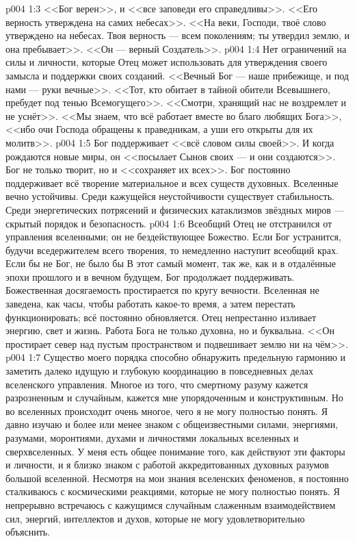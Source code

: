 \vs p004 1:3 <<Бог верен>>, и <<все заповеди его справедливы>>. <<Его верность утверждена на самих небесах>>. <<На веки, Господи, твоё слово утверждено на небесах. Твоя верность --- всем поколениям; ты утвердил землю, и она пребывает>>. <<Он --- верный Создатель>>.
\vs p004 1:4 Нет ограничений на силы и личности, которые Отец может использовать для утверждения своего замысла и поддержки своих созданий. <<Вечный Бог --- наше прибежище, и под нами --- руки вечные>>. <<Тот, кто обитает в тайной обители Всевышнего, пребудет под тенью Всемогущего>>. <<Смотри, хранящий нас не воздремлет и не уснёт>>. <<Мы знаем, что всё работает вместе во благо любящих Бога>>, <<ибо очи Господа обращены к праведникам, а уши его открыты для их молитв>>.
\vs p004 1:5 Бог поддерживает <<всё словом силы своей>>. И когда рождаются новые миры, он <<посылает Сынов своих --- и они создаются>>. Бог не только творит, но и <<сохраняет их всех>>. Бог постоянно поддерживает всё творение материальное и всех существ духовных. Вселенные вечно устойчивы. Среди кажущейся неустойчивости существует стабильность. Среди энергетических потрясений и физических катаклизмов звёздных миров --- скрытый порядок и безопасность.
\vs p004 1:6 Всеобщий Отец не отстранился от управления вселенными; он не бездействующее Божество. Если Бог устранится, будучи вседержителем всего творения, то немедленно наступит всеобщий крах. Если бы не Бог, не было бы  В этот самый момент, так же, как и в отдалённые эпохи прошлого и в вечном будущем, Бог продолжает поддерживать. Божественная досягаемость простирается по кругу вечности. Вселенная не заведена, как часы, чтобы работать какое\hyp{}то время, а затем перестать функционировать; всё постоянно обновляется. Отец непрестанно изливает энергию, свет и жизнь. Работа Бога не только духовна, но и буквальна. <<Он простирает север над пустым пространством и подвешивает землю ни на чём>>.
\vs p004 1:7 \pc Существо моего порядка способно обнаружить предельную гармонию и заметить далеко идущую и глубокую координацию в повседневных делах вселенского управления. Многое из того, что смертному разуму кажется разрозненным и случайным, кажется мне упорядоченным и конструктивным. Но во вселенных происходит очень многое, чего я не могу полностью понять. Я давно изучаю и более или менее знаком с общеизвестными силами, энергиями, разумами, моронтиями, духами и личностями локальных вселенных и сверхвселенных. У меня есть общее понимание того, как действуют эти факторы и личности, и я близко знаком с работой аккредитованных духовных разумов большой вселенной. Несмотря на мои знания вселенских феноменов, я постоянно сталкиваюсь с космическими реакциями, которые не могу полностью понять. Я непрерывно встречаюсь с кажущимся случайным слаженным взаимодействием сил, энергий, интеллектов и духов, которые не могу удовлетворительно объяснить.
